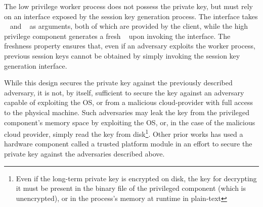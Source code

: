 \documentclass[../main.tex]{subfiles}
\begin{document}
The low privilege worker process does not possess the private key, but
must rely on an interface exposed by the session key generation
process. The interface takes \crandom~ and \premaster~ as arguments,
both of which are provided by the client, while the high privilege
component generates a fresh \srandom~ upon invoking the interface. The
freshness property ensures that, even if an adversary exploits the
worker process, previous session keys cannot be obtained by simply
invoking the session key generation interface.

While this design secures the private key against the previously
described adversary, it is not, by itself, sufficient to secure the
key against an adversary capable of exploiting the OS, or from a
malicious cloud-provider with full access to the physical machine.
Such adversaries may leak the key from the privileged component's
memory space by exploiting the OS, or, in the case of the malicious
cloud provider, simply read the key from disk\footnote{Even if the
  long-term private key is encrypted on disk, the key for decrypting
  it must be present in the binary file of the privileged component
  (which is unencrypted), or in the process's memory at runtime in
  plain-text}. Other prior works has used a hardware component called
a trusted platform module in an effort to secure the private key
against the adversaries described above.
\end{document}
